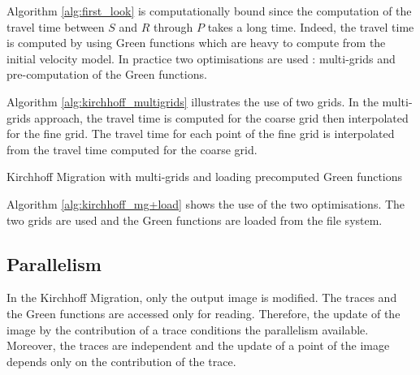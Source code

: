 Algorithm \ref{alg:first_look} is computationally bound since the computation of the travel time between $S$ and $R$ through $P$ takes a long time.
Indeed, the travel time is computed by using Green functions which are heavy to compute from the initial velocity model.
In practice two optimisations are used : multi-grids and pre-computation of the Green functions.

Algorithm \ref{alg:kirchhoff_multigrids} illustrates the use of two grids.
In the multi-grids approach, the travel time is computed for the coarse grid then interpolated for the fine grid.
The travel time for each point of the fine grid is interpolated from the travel time computed for the coarse grid.


\begin{algorithm}[h]
	\DontPrintSemicolon
	\SetAlgoVlined
	\caption{Kirchhoff Migration with multi-grids and loading precomputed Green functions \label{alg:kirchhoff_mg+load}}
\end{algorithm}

Algorithm \ref{alg:kirchhoff_mg+load} shows the use of the two optimisations.
The two grids are used and the Green functions are loaded from the file system.

\subsection{Parallelism}
In the Kirchhoff Migration, only the output image is modified.
The traces and the Green functions are accessed only for reading.
Therefore, the update of the image by the contribution of a trace conditions the parallelism available.
Moreover, the traces are independent and the update of a point of the image depends only on the contribution of the trace.

